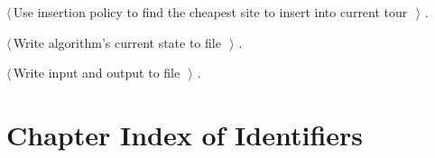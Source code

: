 \documentclass[11.5pt]{report}
\begin{document}
{\begin{list}{}{\setlength{\itemsep}{-\parsep}\setlength{\itemindent}{-\leftmargin}}
\item $\langle\,$Use insertion policy to find the cheapest site to insert into current tour\nobreak\ {\footnotesize {}}$\,\rangle$ {\footnotesize {\NWtxtRefIn} .}
\item $\langle\,$Write algorithm's current state to file\nobreak\ {\footnotesize {}}$\,\rangle$ {\footnotesize {\NWtxtRefIn} .}
\item $\langle\,$Write input and output to file\nobreak\ {\footnotesize {}}$\,\rangle$ {\footnotesize {\NWtxtRefIn} .}
\end{list}}
\section{Chapter Index of Identifiers}
\end{document}
